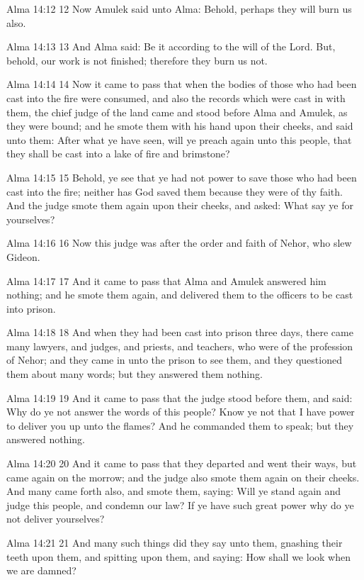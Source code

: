 Alma 14:12
 12 Now Amulek said unto Alma: Behold, perhaps they will burn us
also.

Alma 14:13
 13 And Alma said: Be it according to the will of the Lord. But,
behold, our work is not finished; therefore they burn us not.

Alma 14:14
 14 Now it came to pass that when the bodies of those who had
been cast into the fire were consumed, and also the records which
were cast in with them, the chief judge of the land came and
stood before Alma and Amulek, as they were bound; and he smote
them with his hand upon their cheeks, and said unto them: After
what ye have seen, will ye preach again unto this people, that
they shall be cast into a lake of fire and brimstone?

Alma 14:15
 15 Behold, ye see that ye had not power to save those who had
been cast into the fire; neither has God saved them because they
were of thy faith. And the judge smote them again upon their
cheeks, and asked: What say ye for yourselves?

Alma 14:16
 16 Now this judge was after the order and faith of Nehor, who
slew Gideon.

Alma 14:17
 17 And it came to pass that Alma and Amulek answered him
nothing; and he smote them again, and delivered them to the
officers to be cast into prison.

Alma 14:18
 18 And when they had been cast into prison three days, there
came many lawyers, and judges, and priests, and teachers, who
were of the profession of Nehor; and they came in unto the prison
to see them, and they questioned them about many words; but they
answered them nothing.

Alma 14:19
 19 And it came to pass that the judge stood before them, and
said: Why do ye not answer the words of this people? Know ye not
that I have power to deliver you up unto the flames? And he
commanded them to speak; but they answered nothing.

Alma 14:20
 20 And it came to pass that they departed and went their ways,
but came again on the morrow; and the judge also smote them again
on their cheeks. And many came forth also, and smote them,
saying: Will ye stand again and judge this people, and condemn
our law? If ye have such great power why do ye not deliver
yourselves?

Alma 14:21
 21 And many such things did they say unto them, gnashing their
teeth upon them, and spitting upon them, and saying: How shall we
look when we are damned?

